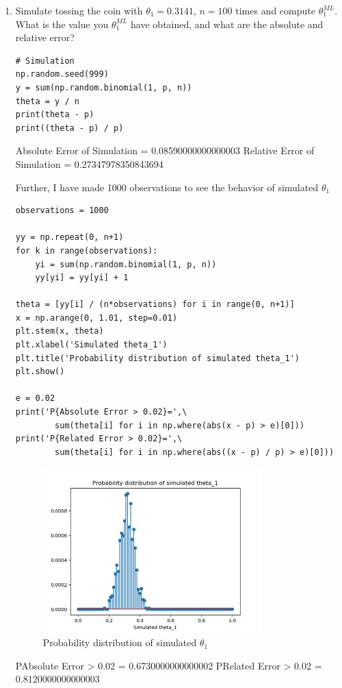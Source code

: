 \documentclass[preprint,12pt]{elsarticle}
\begin{document}
\begin{enumerate}
    \item Simulate tossing the coin with $\theta_1=0.3141$, $n=100$ times
    and compute $\theta_1^{ML}$. What is the value you $\theta_1^{ML}$
    have obtained, and what are the absolute and relative error?
    \begin{lstlisting}
# Simulation
np.random.seed(999)
y = sum(np.random.binomial(1, p, n))
theta = y / n
print(theta - p)
print((theta - p) / p)
    \end{lstlisting}
    \begin{spverbatim}
    Absolute Error of Simulation =  0.08590000000000003
    Relative Error of Simulation =  0.27347978350843694
    \end{spverbatim}

    Further, I have made 1000 observations to see the behavior of simulated 
    $\theta_1$
    \begin{lstlisting}
observations = 1000

yy = np.repeat(0, n+1)
for k in range(observations):
    yi = sum(np.random.binomial(1, p, n))
    yy[yi] = yy[yi] + 1

theta = [yy[i] / (n*observations) for i in range(0, n+1)]
x = np.arange(0, 1.01, step=0.01)
plt.stem(x, theta)
plt.xlabel('Simulated theta_1')
plt.title('Probability distribution of simulated theta_1')
plt.show()

e = 0.02
print('P{Absolute Error > 0.02}=',\
        sum(theta[i] for i in np.where(abs(x - p) > e)[0]))
print('P{Related Error > 0.02}=',\
        sum(theta[i] for i in np.where(abs((x - p) / p) > e)[0]))
    \end{lstlisting}
    \begin{figure}[h]
        \center
        \includegraphics[width=0.8\textwidth]{6.png}
        \caption{Probability distribution of simulated $\theta_1$}
        \label{fig:4}
    \end{figure}
    \begin{spverbatim}
    P{Absolute Error > 0.02} = 0.6730000000000002
    P{Related Error > 0.02} = 0.8120000000000003
    \end{spverbatim}


\end{enumerate}
\end{document}
